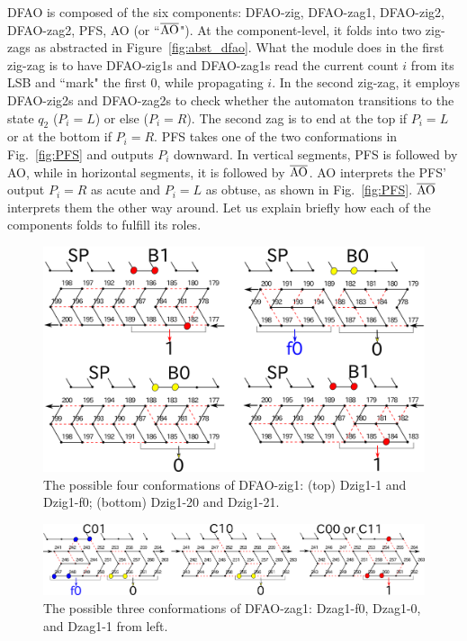 DFAO is composed of the six components: DFAO-zig, DFAO-zag1, DFAO-zig2, DFAO-zag2, PFS, AO (or  ``$\overline{\rm AO}$").
At the component-level, it folds into two zig-zags as abstracted in Figure~\ref{fig:abst_dfao}.
What the module does in the first zig-zag is to have DFAO-zig1s and DFAO-zag1s read the current count $i$ from its LSB and ``mark" the first 0, while propagating $i$.
In the second zig-zag, it employs DFAO-zig2s and DFAO-zag2s to check whether the automaton transitions to the state $q_2$ ($P_i = L$) or else ($P_i = R$).
The second zag is to end at the top if $P_i = L$ or at the bottom if $P_i = R$.
PFS takes one of the two conformations in Fig.~\ref{fig:PFS} and outputs $P_i$ downward.
In vertical segments, PFS is followed by AO, while in horizontal segments, it is followed by $\overline{\rm AO}$.
AO interprets the PFS' output $P_i = R$ as acute and $P_i = L$ as obtuse, as shown in Fig.~\ref{fig:PFS}.
$\overline{\rm AO}$ interprets them the other way around.
Let us explain briefly how each of the components folds to fulfill its roles.

\begin{figure}[h]
\includegraphics[width=\linewidth]{pic/DFAO-zig1.png}  
  \caption{The possible four conformations of DFAO-zig1: (top) Dzig1-1 and Dzig1-f0; (bottom) Dzig1-20 and Dzig1-21.}
  \label{fig:DFAO-zig1}
\end{figure} 


\begin{figure}[h]
  \includegraphics[width=\linewidth]{pic/DFAO-zag1.png}
  \caption{The possible three conformations of DFAO-zag1: Dzag1-f0, Dzag1-0, and Dzag1-1 from left.}
  \label{fig:DFAO-zag1}
\end{figure} 

